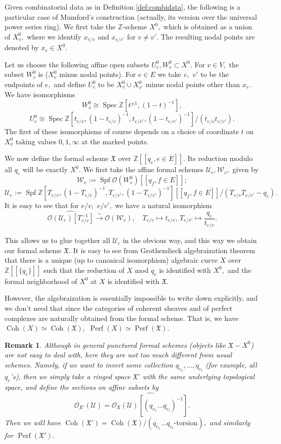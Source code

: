\documentclass[11pt,leqno]{amsart}
\newtheorem{remark}[theo]{Remark}
\numberwithin{equation}{section}
\def\Z{\mathbb{Z}}
\newcommand{\xto}{\xrightarrow}
\newcommand{\Coh}{\operatorname{Coh}}
\newcommand{\cO}{{\mathcal O}}
\newcommand{\cW}{{\mathcal W}}
\newcommand{\cU}{{\mathcal U}}
\newcommand{\mX}{{\mathfrak X}}
\newcommand{\Perf}{\operatorname{Perf}}
\newcommand{\Spec}{\operatorname{Spec}}
\newcommand{\Spf}{\operatorname{Spf}}
\begin{document}
Given combinatorial data as in Definition \ref{def:combidata},
the following is a particular case of Mumford's construction (actually, its version over the universal power series ring). We first take the $\Z$-scheme $X^0,$ which is obtained as a union of $X^0_{v},$ where we identify $x_{e/v}$ and $x_{e/v'}$ for $v\ne v'.$ The resulting nodal points are denoted by $x_{e}\in X^0.$

Let us choose the following affine open subsets $U^0_{e},W^0_{v}\subset X^0.$ For $v\in V,$ the subset $W^0_{v}$ is ($X^0_{v}$ minus nodal points). For $e\in E$ we take $v,$ $v'$ to be the endpoints of $e,$ and define $U^0_{e}$ to be $X^0_{v}\cup X^0_{v'}$ minus nodal points other than $x_{e}.$ We have isomorphisms
$$W_{v}^0\cong\Spec\Z[t^{\pm 1},(1-t)^{-1}],$$
$$U_{e}^0\cong \Spec \Z[t_{e/v},(1-t_{e/v})^{-1},t_{e/v'},(1-t_{e/v'})^{-1}]/(t_{e/v}t_{e/v'}).$$
The first of these isomorphisms of course depends on a choice of coordinate $t$ on $X_{v}^0$ taking values $0,1,\infty$ at the marked points. 

We now define the formal scheme $\mX$ over $\Z[[q_{e},e\in E]].$ Its reduction modulo all $q_{e}$ will be exactly $X^0.$ We first take the affine formal schemes
$\cU_{e},\cW_{v},$ given by
$$\cW_{v}:=\Spf \cO(W_{v}^0)[[q_{f},f\in E]];$$
$$\cU_{e}:=\Spf\Z[T_{e/v},(1-T_{e/v})^{-1},T_{e/v'},(1-T_{e/v'})^{-1}][[q_{f},f\in E]]/(T_{e/v}T_{e/v'}-q_{e}).$$
It is easy to see that for $e/v,$ $e/v',$ we have a natural isomorphism
$$\widehat{\cO(\cU_{e})[T_{e/v}^{-1}]}\xto{\sim}\cO(\cW_{v}),\quad T_{e/v}\mapsto t_{e/v},\, T_{e/v'}\mapsto \frac{q_{e}}{t_{e/v}}.$$ 

This allows us to glue together all $\cU_{e}$ in the obvious way, and this way we obtain our formal scheme $\mX.$ It is easy to see from Grothendieck algebraization theorem that there is a unique (up to canonical isomorphism) algebraic curve $X$ over $\Z[[\{q_{e}\}]]$ such that the reduction of $X$ mod $q_{e}$ is identified with $X^0,$ and the formal neighborhood of $X^0$ at $X$ is identified with $\mX.$

However, the algebraization is essentially impossible to write down explicitly, and we don't need that since the categories of coherent sheaves and of perfect complexes are naturally obtained from the formal scheme. That is, we have $\Coh(X)\simeq\Coh(\mX),$ $\Perf(X)\simeq \Perf(\mX).$

\begin{remark}\label{remark:inverting_q} Although in general punctured formal schemes (objects like $\mX-X^0$) are not easy to deal with, here they are not too much different
from usual schemes. Namely, if we want to invert some collection $q_{e_1},\dots,q_{e_l}$ (for example, all $q_{e}$'s), then we simply take a ringed space $\mX'$ with the same underlying topological space, and define the sections on affine subsets by 
$$\cO_{\mX'}(\cU)=\widehat{\cO_{\mX}(\cU)[(q_{e_1}\dots q_{e_l})^{-1}]}.$$
Then we will have $\Coh(\mX')=\Coh(\mX)/(q_{e_1}\dots q_{e_l}\text{-torsion}),$ and similarly for $\Perf(\mX').$
\end{remark}
\end{document}
